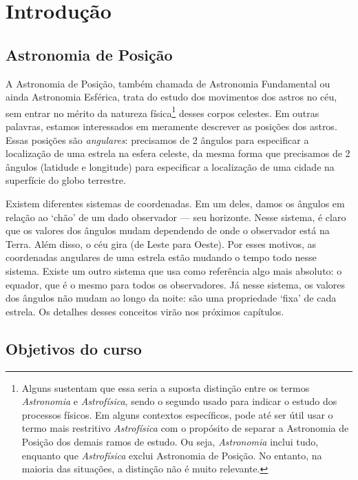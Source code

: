 \chapter{Introdução}
\label{cap01}

\section{Astronomia de Posição}

A Astronomia de Posição, também chamada de Astronomia Fundamental ou ainda Astronomia Esférica, trata do estudo dos movimentos dos astros no céu, sem entrar no mérito da natureza física\footnote{Alguns sustentam que essa seria a suposta distinção entre os termos \textit{Astronomia} e \textit{Astrofísica}, sendo o segundo usado para indicar o estudo dos processos físicos. Em alguns contextos específicos, pode até ser útil usar o termo mais restritivo \textit{Astrofísica} com o propósito de separar a Astronomia de Posição dos demais ramos de estudo. Ou seja, \textit{Astronomia} inclui tudo, enquanto que \textit{Astrofísica} exclui Astronomia de Posição. No entanto, na maioria das situações, a distinção não é muito relevante.} desses corpos celestes. Em outras palavras, estamos interessados em meramente descrever as posições dos astros. Essas posições são \textit{angulares}: precisamos de 2 ângulos para especificar a localização de uma estrela na esfera celeste, da mesma forma que precisamos de 2 ângulos (latidude e longitude) para especificar a localização de uma cidade na superfície do globo terrestre.

Existem diferentes sistemas de coordenadas. Em um deles, damos os ângulos em relação ao `chão' de um dado observador --- seu horizonte. Nesse sistema, é claro que os valores dos ângulos mudam dependendo de onde o observador está na Terra. Além disso, o céu gira (de Leste para Oeste). Por esses motivos, as coordenadas angulares de uma estrela estão mudando o tempo todo nesse sistema. Existe um outro sistema que usa como referência algo mais absoluto: o equador, que é o mesmo para todos os observadores. Já nesse sistema, os valores dos ângulos não mudam ao longo da noite: são uma propriedade `fixa' de cada estrela. Os detalhes desses conceitos virão nos próximos capítulos.

\section{Objetivos do curso}

